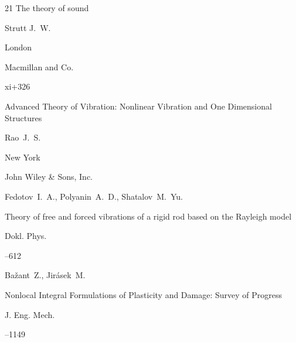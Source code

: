 \begin{thebibliography}{21}
\book The theory of sound

\by Strutt J.~W.

\publaddr London

\publ Macmillan and Co.



\totalpages xi+326








\book Advanced Theory of Vibration: Nonlinear Vibration and One Dimensional Structures

\by Rao~J.~S.

\publaddr New York

\publ John Wiley \& Sons, Inc.









\by Fedotov~I.~A., Polyanin~A.~D., Shatalov~M.~Yu.

\paper Theory of free and forced vibrations of a rigid rod based on the Rayleigh model

\jour Dokl. Phys.



--612 








\by Ba\v{z}ant~Z., Jir\'{a}sek~M.

\paper Nonlocal Integral Formulations of Plasticity and Damage: Survey of Progress

\jour J. Eng. Mech.




--1149






\end{thebibliography}
